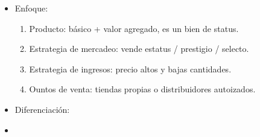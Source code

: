 \begin{itemize}
\begin{itemize}
            \item Enfoque: 
                \begin{enumerate}
                    \item Producto: básico + valor agregado, es un bien de status.
                    \item Estrategia de mercadeo: vende estatus / prestigio / selecto.
                    \item Estrategia de ingresos: precio altos y bajas cantidades.
                    \item Ountos de venta: tiendas propias o distribuidores autoizados.
                \end{enumerate}
            \item Diferenciación: 
        \end{itemize}
        \begin{itemize}[label=\#]
            \item 
        \end{itemize}
\end{itemize}
